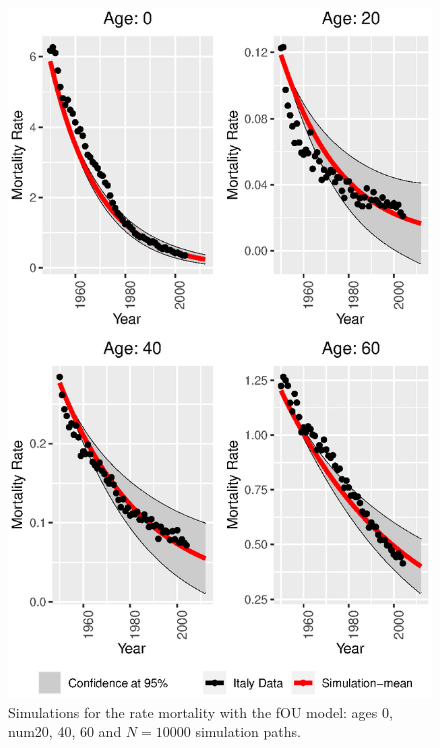\documentclass[smallextended]{svjour3}
\begin{document}
    \begin{figure}[H]
        \includegraphics{woman_confidence_bands.eps}
         \caption{%
             Simulations for the rate mortality with the fOU model: ages
             \num{0}, num{20}, \num{40}, \num{60} and $N=\num{10000}$ simulation
             paths.
         }
             \label{graph-simu_FOU1}
    \end{figure}
\end{document}
